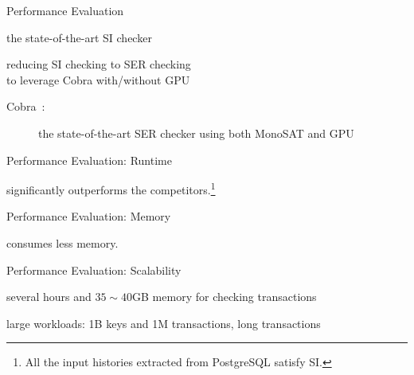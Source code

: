 \begin{frame}{Performance Evaluation}
	\begin{description}
		\setlength{\itemsep}{15pt}
		\item[dbcop~\ncite{Complexity:OOPSLA2019}:]
			the state-of-the-art SI checker
		\item[CobraSI:] reducing SI checking to SER checking \\
		   to leverage Cobra with/without GPU
			\vspace{0.20cm}
			\begin{description}
				\item[Cobra~:]
					the state-of-the-art SER checker using both MonoSAT and GPU
			\end{description}
	\end{description}
\end{frame}

\begin{frame}{Performance Evaluation: Runtime}
	\centerline{\polysi{} significantly outperforms the competitors.\footnote{
		All the input histories extracted from PostgreSQL satisfy SI.
	}}

\end{frame}

\begin{frame}{Performance Evaluation: Memory}
	\centerline{\polysi{} consumes less memory.}
\end{frame}

\begin{frame}{Performance Evaluation: Scalability}
	\begin{center}
		several hours and $35 \sim 40$GB memory for checking  transactions

		\vspace{0.30cm}
		\vspace{0.30cm}

		large workloads: 1B keys and 1M transactions, long transactions
	\end{center}
\end{frame}


